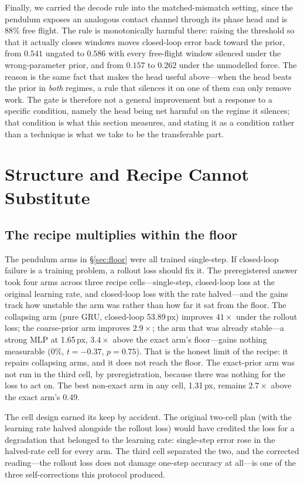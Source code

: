 \documentclass{article}
\begin{document}
Finally, we carried the decode rule into the matched-mismatch setting, since the
pendulum exposes an analogous contact channel through its phase head and is $88\%$ free
flight. The rule is monotonically harmful there: raising the threshold so that it
actually closes windows moves closed-loop error back toward the prior, from $0.541$
ungated to $0.586$ with every free-flight window silenced under the wrong-parameter
prior, and from $0.157$ to $0.262$ under the unmodelled force. The reason is the same
fact that makes the head useful above---when the head beats the prior in \emph{both}
regimes, a rule that silences it on one of them can only remove work. The gate is
therefore not a general improvement but a response to a specific condition, namely the
head being net harmful on the regime it silences; that condition is what this section
measures, and stating it as a condition rather than a technique is what we take to be
the transferable part.

\section{Structure and Recipe Cannot Substitute}\label{sec:substitute}

\subsection{The recipe multiplies within the floor}

The pendulum arms in \S\ref{sec:floor} were all trained single-step. If closed-loop failure is a training problem, a rollout loss should fix it. The preregistered answer took four arms across three recipe cells---single-step, closed-loop loss at the original learning rate, and closed-loop loss with the rate halved---and the gains track how unstable the arm was rather than how far it sat from the floor. The collapsing arm (pure GRU, closed-loop 53.89\,px) improves $41\times$ under the rollout loss; the coarse-prior arm improves $2.9\times$; the arm that was already stable---a strong MLP at 1.65\,px, $3.4\times$ above the exact arm's floor---gains nothing measurable (0\%, $t=-0.37$, $p=0.75$). That is the honest limit of the recipe: it repairs collapsing arms, and it does not reach the floor. The exact-prior arm was not run in the third cell, by preregistration, because there was nothing for the loss to act on. The best non-exact arm in any cell, 1.31\,px, remains $2.7\times$ above the exact arm's 0.49.

The cell design earned its keep by accident. The original two-cell plan (with the learning rate halved alongside the rollout loss) would have credited the loss for a degradation that belonged to the learning rate: single-step error rose in the halved-rate cell for every arm. The third cell separated the two, and the corrected reading---the rollout loss does not damage one-step accuracy at all---is one of the three self-corrections this protocol produced.
\end{document}
